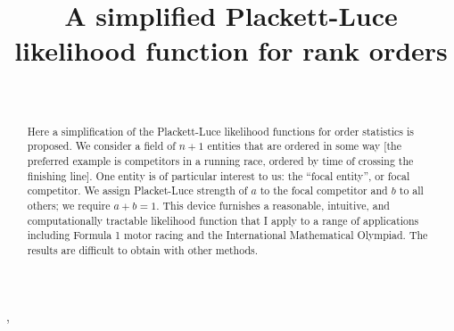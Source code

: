 \documentclass[ejs]{imsart}
\theoremstyle{plain}
\theoremstyle{definition}
\theoremstyle{remark}
\begin{document}
\begin{frontmatter}
\title{A simplified Plackett-Luce likelihood function for rank orders}

\begin{aug}
\author[A]{~},
\address[A]{Computer Science and Mathematics,
University of Stirling}

\end{aug}

\begin{abstract}

Here a simplification of the Plackett-Luce likelihood functions for
order statistics is proposed.  We consider a field of $n+1$ entities
that are ordered in some way [the preferred example is competitors in
  a running race, ordered by time of crossing the finishing line].
One entity is of particular interest to us: the ``focal entity'', or
focal competitor.  We assign Placket-Luce strength of $a$ to the focal
competitor and $b$ to all others; we require $a+b=1$.  This device
furnishes a reasonable, intuitive, and computationally tractable
likelihood function that I apply to a range of applications including
Formula 1 motor racing and the International Mathematical Olympiad.
The results are difficult to obtain with other methods.
\end{abstract}

\begin{keyword}[class=MSC]
\end{keyword}

\begin{keyword}
\end{keyword}

\end{frontmatter}
\end{document}
